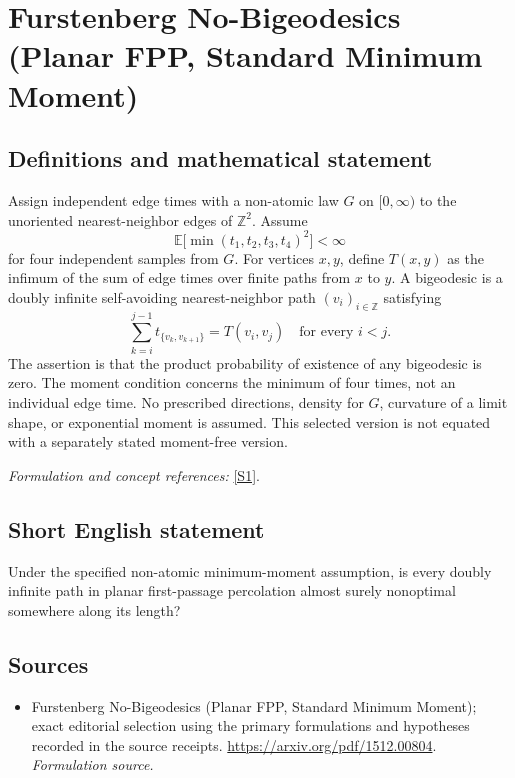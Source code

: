 \documentclass[11pt]{article}
\begin{document}
\section*{\texorpdfstring{Furstenberg No-Bigeodesics (Planar FPP, Standard Minimum Moment)}{Furstenberg No-Bigeodesics (Planar FPP, Standard Minimum Moment)}}\label{30006964}
\subsection{Definitions and mathematical statement}
Assign independent edge times with a non-atomic law $G$ on $[0,\infty)$ to the unoriented nearest-neighbor edges of ${\mathbb{Z}}^2$. Assume
\[
 {\mathbb{E}}\bigl[\min(t_1,t_2,t_3,t_4)^2\bigr]<\infty
\]
for four independent samples from $G$. For vertices $x,y$, define $T(x,y)$ as the infimum of the sum of edge times over finite paths from $x$ to $y$. A bigeodesic is a doubly infinite self-avoiding nearest-neighbor path $(v_i)_{i\in{\mathbb{Z}}}$ satisfying
\[
 \sum_{k=i}^{j-1}t_{\{v_k,v_{k+1}\}}=T(v_i,v_j)
 \quad\text{for every }i<j.
\]
The assertion is that the product probability of existence of any bigeodesic is zero. The moment condition concerns the minimum of four times, not an individual edge time. No prescribed directions, density for $G$, curvature of a limit shape, or exponential moment is assumed. This selected version is not equated with a separately stated moment-free version.
\par\smallskip\textit{Formulation and concept references:} \href{https://arxiv.org/pdf/1512.00804}{[S1]}.

\subsection{Short English statement}
Under the specified non-atomic minimum-moment assumption, is every doubly infinite path in planar first-passage percolation almost surely nonoptimal somewhere along its length?
\subsection{Sources}
\begin{itemize}
\item[S1]Furstenberg No-Bigeodesics (Planar FPP, Standard Minimum Moment); exact editorial selection using the primary formulations and hypotheses recorded in the source receipts.
\url{https://arxiv.org/pdf/1512.00804}.
\textit{Formulation source.}
\end{itemize}
\end{document}
